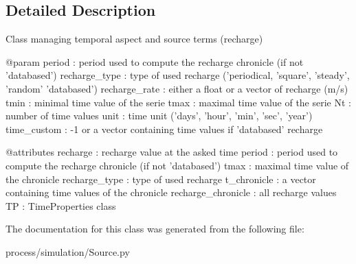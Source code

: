 \subsection{Detailed Description}
\begin{DoxyVerb}    Class managing temporal aspect and source terms (recharge)

    @param
      period : period used to compute the recharge chronicle (if not 'databased')
      recharge_type : type of used recharge ('periodical, 'square', 'steady', 'random'
                                             'databased')
      recharge_rate : either a float or a vector of recharge (m/s)
      tmin : minimal time value of the serie
      tmax : maximal time value of the serie
      Nt : number of time values
      unit : time unit ('days', 'hour', 'min', 'sec', 'year')
      time_custom : -1 or a vector containing time values if 'databased' recharge

    @attributes
      recharge : recharge value at the asked time
      period : period used to compute the recharge chronicle (if not 'databased')
      tmax : maximal time value of the chronicle
      recharge_type : type of used recharge
      t_chronicle : a vector containing time values of the chronicle
      recharge_chronicle : all recharge values
      TP : TimeProperties class\end{DoxyVerb}
 

The documentation for this class was generated from the following file\+:\begin{DoxyCompactItemize}
\item 
process/simulation/Source.\+py\end{DoxyCompactItemize}
